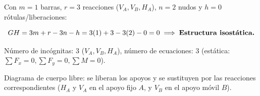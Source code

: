 Con $m = 1$ barras, $r = 3$ reacciones ($V_A, V_B, H_A$), $n = 2$ nudos y $h = 0$ rótulas/liberaciones:

\begin{equation}

    GH = 3m + r - 3n - h = 3(1) + 3 - 3(2) - 0 = 0 \implies \text{\textbf{Estructura isostática.}}

\end{equation}

Número de incógnitas: $3$ ($V_A, V_B, H_A$), número de ecuaciones: $3$ (estática: $\sum F_x = 0, \sum F_y = 0, \sum M = 0$).






Diagrama de cuerpo libre: se liberan los apoyos y se sustituyen por las reacciones correspondientes ($H_A$ y $V_A$ en el apoyo fijo $A$, y $V_B$ en el apoyo móvil $B$).



